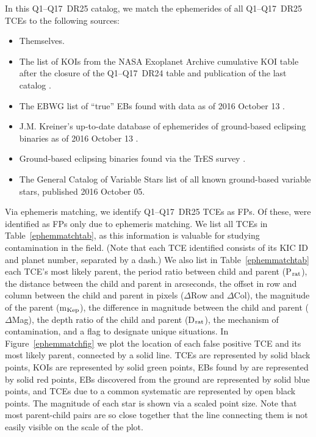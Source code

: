 In this Q1--Q17~DR25 catalog, we match the ephemerides of all Q1--Q17~DR25 TCEs \citep{Twicken2016} to the following sources:

\begin{itemize}
 \item Themselves.
 \item The list of \npredrtwentyfivekois{} KOIs from the NASA Exoplanet Archive cumulative KOI table after the closure of the Q1--Q17~DR24 table and publication of the last catalog \citep{Coughlin2016}.
 \item The \kepler{} EBWG list of \nkebs{} ``true'' EBs found with \kepler{} data as of 2016 October 13 \citep{Prsa2011,Slawson2011,Kirk2016}.
 \item J.M. Kreiner's up-to-date database of ephemerides of ground-based eclipsing binaries as of 2016 October 13 \citep{Kreiner2004}.
 \item Ground-based eclipsing binaries found via the TrES survey \citep{Devor2008a}.
 \item The General Catalog of Variable Stars \citep[GCVS][]{Samus2015} list of all known ground-based variable stars, published 2016 October 05.
\end{itemize}






Via ephemeris matching, we identify \nephemmatch{} Q1--Q17~DR25 TCEs as FPs. Of these, \nonlyephemmatch{} were identified as FPs only due to ephemeris matching. We list all \nephemmatch{} TCEs in Table~\ref{ephemmatchtab}, as this information is valuable for studying contamination in the \kepler{} field. (Note that each TCE identified consists of its KIC ID and planet number, separated by a dash.) We also list in Table~\ref{ephemmatchtab} each TCE's most likely parent, the period ratio between child and parent (P$_{\rm rat}$), the distance between the child and parent in arcseconds, the offset in row and column between the child and parent in pixels ($\Delta$Row and $\Delta$Col), the magnitude of the parent (m$_{\rm Kep}$), the difference in magnitude between the child and parent ($\Delta$Mag), the depth ratio of the child and parent (D$_{\rm rat}$), the mechanism of contamination, and a flag to designate unique situations. In Figure~\ref{ephemmatchfig} we plot the location of each false positive TCE and its most likely parent, connected by a solid line. TCEs are represented by solid black points, KOIs are represented by solid green points, EBs found by \kepler{} are represented by solid red points, EBs discovered from the ground are represented by solid blue points, and TCEs due to a common systematic are represented by open black points. The \kepler{} magnitude of each star is shown via a scaled point size. Note that most parent-child pairs are so close together that the line connecting them is not easily visible on the scale of the plot. 


